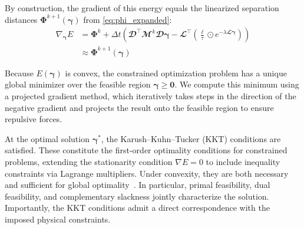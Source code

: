 \documentclass[a4paper,fleqn]{cas-dc}
\begin{document}
By construction, the gradient of this energy equals the linearized separation distances $\mathbf{\Phi}^{k+1}(\boldsymbol{\gamma})$ from \autoref{eq:phi_expanded}:
{\small
\begin{equation}
    \begin{split}
        \nabla_{\boldsymbol{\gamma}} E & = \boldsymbol{\Phi}^k + \Delta t \left( \mathbfcal{D}^\top \mathbfcal{M}^k \mathbfcal{D} \boldsymbol{\gamma} - \mathbfcal{L}^\top \left( \frac{\boldsymbol{\ell}}{\tau} \odot e^{-\lambda \mathbfcal{L} \boldsymbol{\gamma}} \right)  \right) \\
        & \approx \boldsymbol{\Phi}^{k+1}(\boldsymbol{\gamma})
    \end{split}
\end{equation}
}

Because $E(\boldsymbol{\gamma})$ is convex, the constrained optimization problem has a unique global minimizer over the feasible region $\boldsymbol{\gamma} \geq \mathbf{0}$. We compute this minimum using a projected gradient method, which iteratively takes steps in the direction of the negative gradient and projects the result onto the feasible region to ensure repulsive forces.

At the optimal solution $\boldsymbol{\gamma}^*$, the Karush–Kuhn–Tucker (KKT) conditions are satisfied. These constitute the first-order optimality conditions for constrained problems, extending the stationarity condition $\nabla E = 0$ to include inequality constraints via Lagrange multipliers. Under convexity, they are both necessary and sufficient for global optimality~\cite{Nocedal2006}. In particular, primal feasibility, dual feasibility, and complementary slackness jointly characterize the solution. Importantly, the KKT conditions admit a direct correspondence with the imposed physical constraints.
\end{document}
